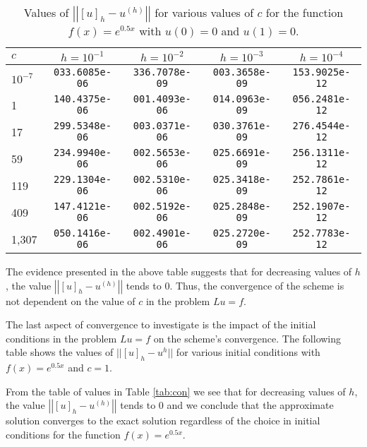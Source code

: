 \begin{table}[h!]
  \centering
  \bgroup
  \def\arraystretch{1.5}
  \begin{tabular}{| l | c | c | c | c |}
    \hline
    $c$ & $h = 10^{-1}$ & $h = 10^{-2}$ & $h = 10^{-3}$ & $h = 10^{-4}$ \\
    \hline
    $10^{-7}$ & \texttt{033.6085e-06} &  \texttt{336.7078e-09} &   \texttt{003.3658e-09} &   \texttt{153.9025e-12} \\
    1 & \texttt{140.4375e-06} &  \texttt{001.4093e-06} &   \texttt{014.0963e-09} &   \texttt{056.2481e-12} \\
    17 & \texttt{299.5348e-06} &  \texttt{003.0371e-06} &   \texttt{030.3761e-09} &   \texttt{276.4544e-12} \\
    59 & \texttt{234.9940e-06} &  \texttt{002.5653e-06} &   \texttt{025.6691e-09} &   \texttt{256.1311e-12} \\
    119 & \texttt{229.1304e-06} &  \texttt{002.5310e-06} &   \texttt{025.3418e-09} &   \texttt{252.7861e-12} \\
    409 &\texttt{147.4121e-06} &  \texttt{002.5192e-06} &   \texttt{025.2848e-09} &   \texttt{252.1907e-12} \\
    1,307 & \texttt{050.1416e-06} &  \texttt{002.4901e-06} &   \texttt{025.2720e-09} &   \texttt{252.7783e-12} \\
    \hline
  \end{tabular}
  \egroup
  \caption{Values of $\left|\left|[u]_h - u^{(h)}\right|\right|$ for various values of
    $c$ for the function $f(x) = e^{0.5x}$ with $u(0) = 0$ and $u(1) = 0$.}
\end{table}

The evidence presented in the above table suggests that for decreasing values of $h$,
the value $\left|\left|[u]_h - u^{(h)}\right|\right|$ tends to 0. Thus, the convergence of the
scheme is not dependent on the value of $c$ in the problem $Lu = f$.

The last aspect of convergence to investigate is the impact of the initial conditions
in the problem $Lu = f$ on the scheme's convergence.
The following table shows the values of $||[u]_h - u^{h}||$ for various
initial conditions with $f(x) = e^{0.5x}$ and $c=1$.


From the table of values in Table \ref{tab:con} we see that for decreasing values
of $h$, the value $\left|\left|[u]_h - u^{(h)}\right|\right|$ tends to 0 and we
conclude that the approximate solution
converges to the exact solution regardless of the choice in initial conditions for the function
$f(x) = e^{0.5x}$.

